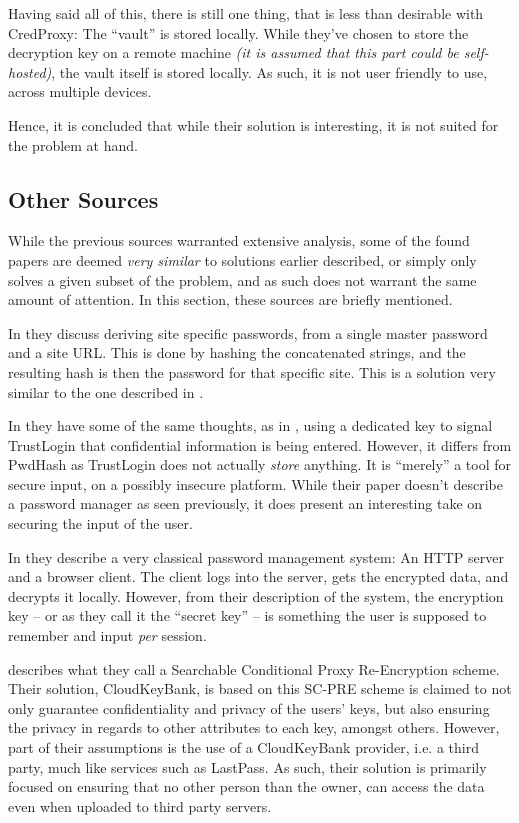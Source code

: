 			Having said all of this, there is still one thing, that is less than desirable with CredProxy: The ``vault'' is stored locally. While they've chosen to store the decryption key on a remote machine \emph{(it is assumed that this part could be self-hosted)}, the vault itself is stored locally. As such, it is not user friendly to use, across multiple devices.

			Hence, it is concluded that while their solution is interesting, it is not suited for the problem at hand.

		\subsection*{Other Sources}
			While the previous sources warranted extensive analysis, some of the found papers are deemed \emph{very similar} to solutions earlier described, or simply only solves a given subset of the problem, and as such does not warrant the same amount of attention. In this section, these sources are briefly mentioned. 

			In \cite{halderman2005} they discuss deriving site specific passwords, from a single master password and a site URL. This is done by hashing the concatenated strings, and the resulting hash is then the password for that specific site. This is a solution very similar to the one described in \cite{pwdhash}.

			In \cite{zhang2015} they have some of the same thoughts, as in \cite{pwdhash}, using a dedicated key to signal TrustLogin that confidential information is being entered. However, it differs from PwdHash as TrustLogin does not actually \emph{store} anything. It is ``merely'' a tool for secure input, on a possibly insecure platform. While their paper doesn't describe a password manager as seen previously, it does present an interesting take on securing the input of the user.

			In \cite{englert2009} they describe a very classical password management system: An HTTP server and a browser client. The client logs into the server, gets the encrypted data, and decrypts it locally. However, from their description of the system, the encryption key -- or as they call it the ``secret key'' -- is something the user is supposed to remember and input \emph{per} session. 

			\cite{huang2015} describes what they call a Searchable Conditional Proxy Re-Encryption scheme. Their solution, CloudKeyBank, is based on this SC-PRE scheme is claimed to not only guarantee confidentiality and privacy of the users' keys, but also ensuring the privacy in regards to other attributes to each key, amongst others. However, part of their assumptions is the use of a CloudKeyBank provider, i.e. a third party, much like services such as LastPass. As such, their solution is primarily focused on ensuring that no other person than the owner, can access the data even when uploaded to third party servers.

